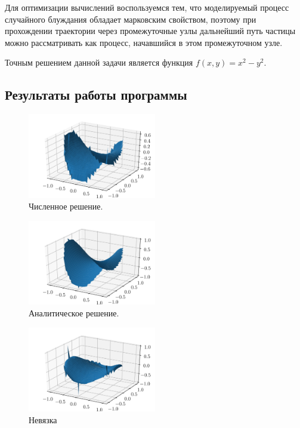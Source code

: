 \documentclass[12pt, a4paper]{article} %
\begin{document}
Для оптимизации вычислений воспользуемся тем, что моделируемый процесс случайного блуждания обладает марковским свойством, поэтому при прохождении траектории через промежуточные узлы дальнейший путь частицы можно рассматривать как процесс, начавшийся в этом промежуточном узле.

Точным решением данной задачи является функция $f(x, y) = x^2 - y^2$.

\subsection{Результаты работы программы}

\begin{figure}[H]
    \centering
    \includegraphics[width=0.5\textwidth]{figures/08_mc.png}
    \caption{Численное решение.}
    \label{fig:08_mc}
\end{figure}
\begin{figure}[H]
    \centering
    \includegraphics[width=0.5\textwidth]{figures/08_anal.png}
    \caption{Аналитическое решение.}
    \label{fig:08_anal}
\end{figure}
\begin{figure}[H]
    \centering
    \includegraphics[width=0.5\textwidth]{figures/08_discr.png}
    \caption{Невязка}
    \label{fig:08_discr}
\end{figure}
\end{document}
